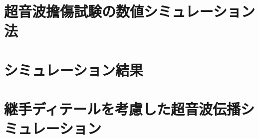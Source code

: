 ﻿\documentclass[11pt,a4j]{mybook2}
\begin{document}
\tableofcontents
\frontmatter
\mainmatter
	
\chapter{超音波擔傷試験の数値シミュレーション法}
	
\chapter{シミュレーション結果}
	
\chapter{継手ディテールを考慮した超音波伝播シミュレーション}
	
\end{document}
